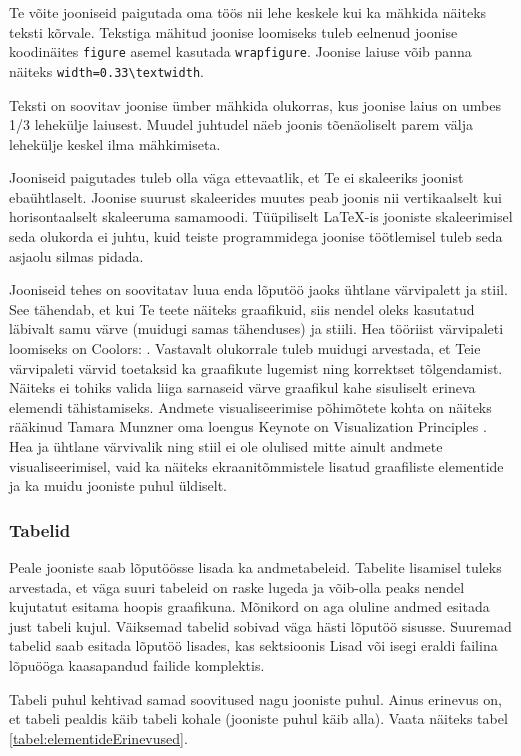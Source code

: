 Te võite jooniseid paigutada oma töös nii lehe keskele kui ka mähkida näiteks teksti kõrvale. Tekstiga mähitud joonise loomiseks tuleb eelnenud joonise koodinäites \verb|figure| asemel kasutada \verb|wrapfigure|. Joonise laiuse võib panna näiteks \verb|width=0.33\textwidth|.

Teksti on soovitav joonise ümber mähkida olukorras, kus joonise laius on umbes 1/3 lehekülje laiusest. Muudel juhtudel näeb joonis tõenäoliselt parem välja lehekülje keskel ilma mähkimiseta.

Jooniseid paigutades tuleb olla väga ettevaatlik, et Te ei skaleeriks joonist ebaühtlaselt. Joonise suurust skaleerides muutes peab joonis nii vertikaalselt kui horisontaalselt skaleeruma samamoodi. Tüüpiliselt LaTeX-is jooniste skaleerimisel seda olukorda ei juhtu, kuid teiste programmidega joonise töötlemisel tuleb seda asjaolu silmas pidada.

Jooniseid tehes on soovitatav luua enda lõputöö jaoks ühtlane värvipalett ja stiil. See tähendab, et kui Te teete näiteks graafikuid, siis nendel oleks kasutatud läbivalt samu värve (muidugi samas tähenduses) ja stiili. Hea tööriist värvipaleti loomiseks on Coolors: . Vastavalt olukorrale tuleb muidugi arvestada, et Teie värvipaleti värvid toetaksid ka graafikute lugemist ning korrektset tõlgendamist. Näiteks ei tohiks valida liiga sarnaseid värve graafikul kahe sisuliselt erineva elemendi tähistamiseks. Andmete visualiseerimise põhimõtete kohta on näiteks rääkinud Tamara Munzner oma loengus Keynote on Visualization Principles \cite{tamara_munzner_keynote_2012}. Hea ja ühtlane värvivalik ning stiil ei ole olulised mitte ainult andmete visualiseerimisel, vaid ka näiteks ekraanitõmmistele lisatud graafiliste elementide ja ka muidu jooniste puhul üldiselt.

\subsubsection{Tabelid}
Peale jooniste saab lõputöösse lisada ka andmetabeleid. Tabelite lisamisel tuleks arvestada, et väga suuri tabeleid on raske lugeda ja võib-olla peaks nendel kujutatut esitama hoopis graafikuna. Mõnikord on aga oluline andmed esitada just tabeli kujul. Väiksemad tabelid sobivad väga hästi lõputöö sisusse. Suuremad tabelid saab esitada lõputöö lisades, kas sektsioonis Lisad või isegi eraldi failina lõpuööga kaasapandud failide komplektis.

Tabeli puhul kehtivad samad soovitused nagu jooniste puhul. Ainus erinevus on, et tabeli pealdis käib tabeli kohale (jooniste puhul käib alla). Vaata näiteks tabel \ref{tabel:elementideErinevused}.

